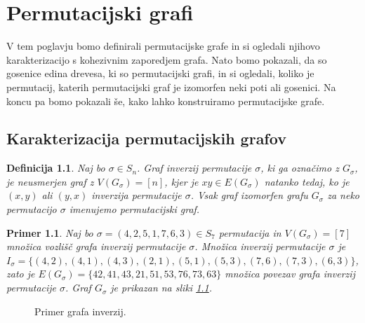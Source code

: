 \documentclass[a4paper, 12pt]{book}
\newtheorem{definicija}{Definicija}[chapter]
\newtheorem{primer}{Primer}[chapter]
\begin{document}
\chapter{ Permutacijski grafi }

V tem poglavju bomo definirali permutacijske grafe in si ogledali njihovo karakterizacijo s kohezivnim zaporedjem grafa. Nato bomo pokazali, da so gosenice edina drevesa, ki so permutacijski grafi, in si ogledali, koliko je permutacij, katerih permutacijski graf je izomorfen neki poti ali gosenici. Na koncu pa bomo pokazali še, kako lahko konstruiramo permutacijske grafe.

\section{ Karakterizacija permutacijskih grafov }

\begin{definicija}
    Naj bo $\sigma \in S_n$. Graf inverzij permutacije $\sigma$, ki ga označimo z $G_{\sigma}$, je neusmerjen graf z $V(G_{\sigma}) = [n]$, kjer je $xy \in E(G_{\sigma})$ natanko tedaj, ko je $(x, y)$ ali $(y, x)$ inverzija permutacije $\sigma$. Vsak graf izomorfen grafu $G_{\sigma}$ za neko permutacijo $\sigma$ imenujemo permutacijski graf.
\end{definicija}

\begin{primer}
    Naj bo $\sigma = (4, 2, 5, 1, 7, 6, 3) \in S_7$ permutacija in $V(G_{\sigma}) =[7]$ množica vozlišč grafa inverzij permutacije $\sigma$. Množica inverzij permutacije $\sigma$ je
    $I_{\sigma} = \{ (4, 2), (4, 1), (4, 3), (2, 1), (5, 1), (5, 3), (7, 6), (7, 3), (6, 3) \}$,
    zato je $E(G_{\sigma}) = \{ 42, 41, 43, 21, 51, 53, 76, 73, 63 \}$  množica povezav grafa inverzij permutacije $\sigma$. Graf $G_{\sigma}$ je prikazan na sliki \ref{graf_inverzij}.
\end{primer}

\begin{figure}[h]
    \begin{center}        
    \end{center}
    \caption{Primer grafa inverzij.}
    \label{graf_inverzij}
\end{figure}
\end{document}
